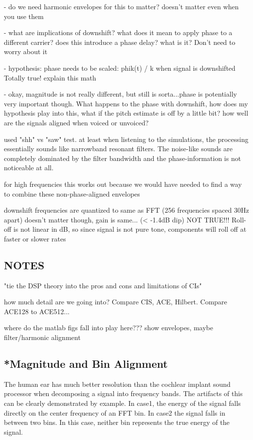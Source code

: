 \documentclass [11pt, proquest] {uwthesis}[2015/03/03]
\begin{document}
 - do we need harmonic envelopes for this to matter?
 doesn't matter even when you use them

 - what are implications of downshift? what does it mean to apply phase to a different carrier? does this introduce a phase delay? what is it?
 Don't need to worry about it
 
 - hypothesis: phase needs to be scaled: phik(t) / k when signal is downshifted
 Totally true! explain this math
 
 - okay, magnitude is not really different, but still is sorta...phase is potentially very important though.  What happens to the phase with downshift, how does my hypothesis play into this, what if the pitch estimate is off by a little bit?  how well are the signals aligned when voiced or unvoiced?
 
used "shh" vs "saw" test.  at least when listening to the simulations, the processing essentially sounds like narrowband resonant filters.  The noise-like sounds are completely dominated by the filter bandwidth and the phase-information is not noticeable at all.

for high frequencies this works out because we would have needed to find a way to combine these non-phase-aligned envelopes

downshift frequencies are quantized to same as FFT (256 frequencies spaced 30Hz apart)
doesn't matter though, gain is same... (< -1.4dB dip)
NOT TRUE!!! Roll-off is not linear in dB, so since signal is not pure tone, components will roll off at faster or slower rates

\subsection{NOTES}

"tie the DSP theory into the pros and cons and limitations of CIs"

how much detail are we going into?  Compare CIS, ACE, Hilbert.  Compare ACE128 to ACE512...

where do the matlab figs fall into play here???
show envelopes, maybe filter/harmonic alignment

\subsection{*Magnitude and Bin Alignment}

The human ear has much better resolution than the cochlear implant sound processor when decomposing a signal into frequency bands.  The artifacts of this can be clearly demonstrated by example.  In case1, the energy of the signal falls directly on the center frequency of an FFT bin.  In case2 the signal falls in between two bins.  In this case, neither bin represents the true energy of the signal.
\end{document}
